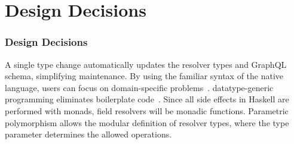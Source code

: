 
\section{Design Decisions} 

\begin{frame}\frametitle{Design Decisions}

\begin{itemize}
     A single type change automatically updates the resolver types and GraphQL schema, simplifying maintenance. 
     By using the familiar syntax of the native language, users can focus on domain-specific problems~\cite{edsl-modeling}.
    datatype-generic programming eliminates boilerplate code~\cite{scrap-your-boilerplate}.
     Since all side effects in Haskell are performed with monads, field resolvers will be monadic functions. 
     Parametric polymorphism allows the modular definition of resolver types, where the type parameter determines the allowed operations.  
\end{itemize}
\end{frame}